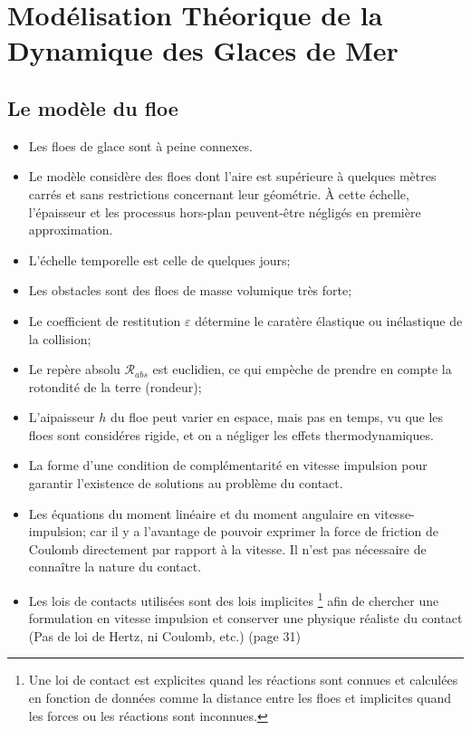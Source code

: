 \documentclass[
  french,
	11pt, %
]{fphw}
\begin{document}


\section{Modélisation Théorique de la Dynamique des Glaces de Mer}

\subsection{Le modèle du floe}


\begin{itemize}
  \item Les floes de glace sont à peine connexes. 
  \item Le modèle considère des floes dont l’aire est supérieure à quelques mètres carrés et sans restrictions concernant leur géométrie. À cette échelle, l’épaisseur et les processus hors-plan peuvent-être négligés en première approximation.
  \item L'échelle temporelle est celle de quelques jours;
  \item Les obstacles sont des floes de masse volumique très forte;
  \item Le coefficient de restitution $\varepsilon$ détermine le caratère élastique ou inélastique de la collision;
  \item Le repère absolu $\mathcal{R}_{abs}$ est euclidien, ce qui empèche de prendre en compte la rotondité de la terre (rondeur);
  \item L'aipaisseur $h$ du floe peut varier en espace, mais pas en temps, vu que les floes sont considéres rigide, et on a négliger les effets thermodynamiques.
  \item La forme d’une condition de complémentarité en vitesse impulsion pour garantir l’existence de solutions au problème du contact.
  \item Les équations du moment linéaire et du moment angulaire en vitesse-impulsion; car il y a l’avantage de pouvoir exprimer la force de friction de Coulomb directement par rapport à la vitesse. Il n’est pas nécessaire de connaître la nature
  du contact.
  \item Les lois de contacts utilisées sont des lois implicites \footnote{Une loi de contact est explicites quand les réactions sont connues et calculées en fonction de données comme la distance entre les floes et implicites quand les forces ou les réactions sont inconnues.} afin de chercher une formulation en vitesse impulsion et conserver une physique réaliste du contact (Pas de loi de Hertz, ni Coulomb, etc.) (page 31)

\end{itemize}
\end{document}
